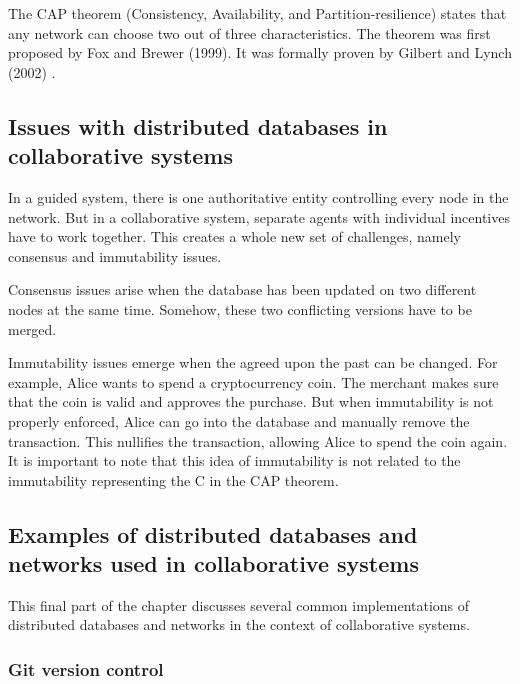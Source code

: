 The CAP theorem (Consistency, Availability, and Partition-resilience) states that any network can choose two out of three characteristics. The theorem was first proposed by Fox and Brewer (1999). It was formally proven by Gilbert and Lynch (2002) \cite{gilbert-lynch-cap-proof}.

\subsection{Issues with distributed databases in collaborative systems}
\label{subsec:issues-distributed-dbs}

In a guided system, there is one authoritative entity controlling every node in the network. But in a collaborative system, separate agents with individual incentives have to work together. This creates a whole new set of challenges, namely consensus and immutability issues.

Consensus issues arise when the database has been updated on two different nodes at the same time. Somehow, these two conflicting versions have to be merged. %

Immutability issues emerge when the agreed upon the past can be changed. For example, Alice wants to spend a cryptocurrency coin. The merchant makes sure that the coin is valid and approves the purchase. But when immutability is not properly enforced, Alice can go into the database and manually remove the transaction. This nullifies the transaction, allowing Alice to spend the coin again. It is important to note that this idea of immutability is not related to the immutability representing the C in the CAP theorem.

\subsection{Examples of distributed databases and networks used in collaborative systems}
\label{subsec:examples-distributed-dbs}

This final part of the chapter discusses several common implementations of distributed databases and networks in the context of collaborative systems. 

\subsubsection{Git version control}

